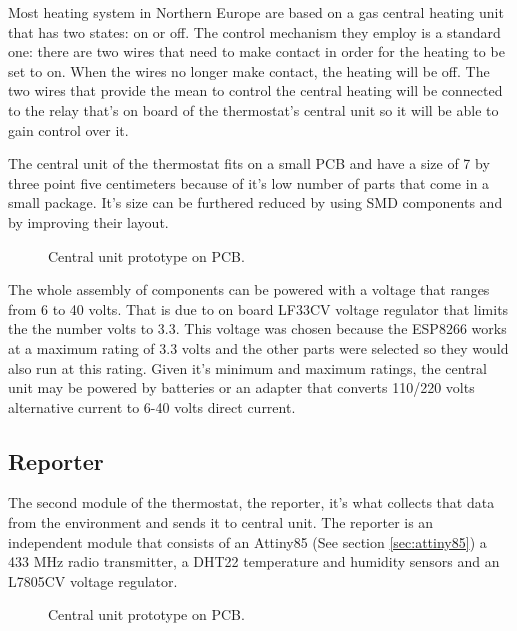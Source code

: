 Most heating system in Northern Europe are based on a gas central heating unit that has two states: on or off.
The control mechanism they employ is a standard one: there are two wires that need to make contact in order
for the heating to be set to on. When the wires no longer make contact, the heating will be off.
The two wires that provide the mean to control the central heating will be connected to the relay that's on
board of the thermostat's central unit so it will be able to gain control over it.

The central unit of the thermostat fits on a small PCB and have a size of 7 by three point five centimeters
because of it's low number of parts that come in a small package. It's size can be furthered reduced by using
SMD components and by improving their layout.

\begin{figure}[h!]
    \label{fig:central_unit_diag}
    \centerline{}
    \caption[Central Unit Prototype On PCB]{Central unit prototype on PCB.}
    \label{fig:central_unit_diag}
\end{figure}

The whole assembly of components can be powered with a voltage that ranges from 6 to 40 volts. That is due to
on board LF33CV voltage regulator that limits the the number volts to 3.3. This voltage was chosen because
the ESP8266 works at a maximum rating of 3.3 volts and the other parts were selected so they would also run
at this rating.
Given it's minimum and maximum ratings, the central unit may be powered by batteries or an adapter that
converts 110/220  volts alternative current to 6-40 volts direct current.



\subsection{Reporter}

The second module of the thermostat, the reporter, it's what collects that data from the environment and sends
it to central unit. The reporter is an independent module that consists of an Attiny85 (See section
\ref{sec:attiny85}) a 433 MHz radio transmitter, a DHT22 temperature and humidity sensors and an L7805CV voltage
regulator.

\begin{figure}[h!]
    \label{fig:reporter_diag}
    \centerline{}
    \caption[Central Unit Prototype On PCB]{Central unit prototype on PCB.}
    \label{fig:reporter_diag}
\end{figure}

